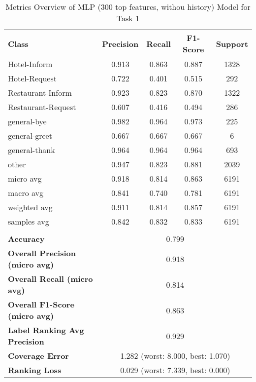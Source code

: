 
\begin{table}[h]
\centering

\begin{tabular}{|l|c|c|c|c|}
\hline
\textbf{Class}& \textbf{Precision} & \textbf{Recall} & \textbf{F1-Score} & \textbf{Support} \\ \hline
Hotel-Inform & 0.913 & 0.863 & 0.887 & 1328 \\ \hline
Hotel-Request & 0.722 & 0.401 & 0.515 & 292 \\ \hline
Restaurant-Inform & 0.923 & 0.823 & 0.870 & 1322 \\ \hline
Restaurant-Request & 0.607 & 0.416 & 0.494 & 286 \\ \hline
general-bye & 0.982 & 0.964 & 0.973 & 225 \\ \hline
general-greet & 0.667 & 0.667 & 0.667 & 6 \\ \hline
general-thank & 0.964 & 0.964 & 0.964 & 693 \\ \hline
other & 0.947 & 0.823 & 0.881 & 2039 \\ \hline\hline
micro avg & 0.918 & 0.814 & 0.863 & 6191 \\ \hline
macro avg & 0.841 & 0.740 & 0.781 & 6191 \\ \hline
weighted avg & 0.911 & 0.814 & 0.857 & 6191 \\ \hline
samples avg & 0.842 & 0.832 & 0.833 & 6191 \\ \hline
\multicolumn{5}{c}{}\\ \hline

\textbf{Accuracy}                    & \multicolumn{4}{c|}{0.799}                                 \\ \hline
\textbf{Overall Precision (micro avg)}           & \multicolumn{4}{c|}{0.918}                                \\ \hline
\textbf{Overall Recall (micro avg)}              & \multicolumn{4}{c|}{0.814}                                   \\ \hline
\textbf{Overall F1-Score (micro avg)}            & \multicolumn{4}{c|}{0.863}                                  \\ \hline
\textbf{Label Ranking Avg Precision} & \multicolumn{4}{c|}{0.929}                                    \\ \hline
\textbf{Coverage Error}              & \multicolumn{4}{c|}{1.282 (worst: 8.000, best: 1.070)}                             \\ \hline
\textbf{Ranking Loss}                & \multicolumn{4}{c|}{0.029 (worst: 7.339, best: 0.000)}                             \\ \hline
\end{tabular}

\caption{Metrics Overview of MLP (300 top features, withou history) Model for Task 1}
\label{table:MLP (300 top features, withou history)_metrics_task_1}
\end{table}
    